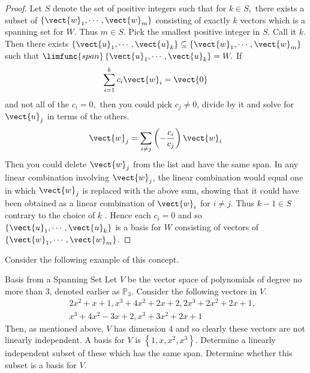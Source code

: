 \begin{proof}
Let $S$ denote the set of positive integers such that for $
k\in S,$ there exists a subset of $\left\{ \vect{w}_{1},\cdots ,\vect{w}
_{m}\right\} $ consisting of exactly $k$ vectors which is a spanning set for 
$W$. Thus $m\in S$. Pick the smallest positive integer in $S$. Call it $k$.
Then there exists $\left\{ \vect{u}_{1},\cdots ,\vect{u}_{k}\right\} \subseteq
\left\{ \vect{w}_{1},\cdots ,\vect{w}_{m}\right\} $ such that $\limfunc{span}
\left\{ \vect{u}_{1},\cdots ,\vect{u}_{k}\right\} =W.$ If 
\begin{equation*}
\sum_{i=1}^{k}c_{i}\vect{w}_{i}=\vect{0}
\end{equation*}
and not all of the $c_{i}=0,$ then you could pick $c_{j}\neq 0$, divide by
it and solve for $\vect{u}_{j}$ in terms of the others. 
\begin{equation*}
\vect{w}_{j}=\sum_{i\neq j}\left( -\frac{c_{i}}{c_{j}}\right) \vect{w}_{i}
\end{equation*}
Then you could delete $\vect{w}_{j}$ from the list and have the same span.
In any linear combination involving $\vect{w}_{j}$, the linear
combination would equal one in which $\vect{w}_{j}$ is replaced with the
above sum, showing that it could have been obtained as a linear combination
of $\vect{w}_{i}$ for $i\neq j$. Thus $k-1\in S$ contrary to the choice of $k$
. Hence each $c_{i}=0$ and so $\left\{ \vect{u}_{1},\cdots ,\vect{u}
_{k}\right\} $ is a basis for $W$ consisting of vectors of $\left\{ \vect{w}
_{1},\cdots ,\vect{w}_{m}\right\} $. 
\end{proof}

Consider the following example of this concept. 

\begin{example}{Basis from a Spanning Set}{}
Let $V$ be the vector space of polynomials of degree no more than 3,
denoted earlier as $\mathbb{P}_{3}$. Consider the following vectors in $V$.
\begin{eqnarray*}
&&2x^{2}+x+1,x^{3}+4x^{2}+2x+2,2x^{3}+2x^{2}+2x+1, \\
&&x^{3}+4x^{2}-3x+2,x^{3}+3x^{2}+2x+1
\end{eqnarray*}
Then, as mentioned above, $V$ has dimension 4 and so clearly these vectors
are not linearly independent. A basis for $V$ is $\left\{
1,x,x^{2},x^{3}\right\} $. Determine a linearly independent subset of these
which has the same span. Determine whether this subset is a basis for $V$.
\end{example}

